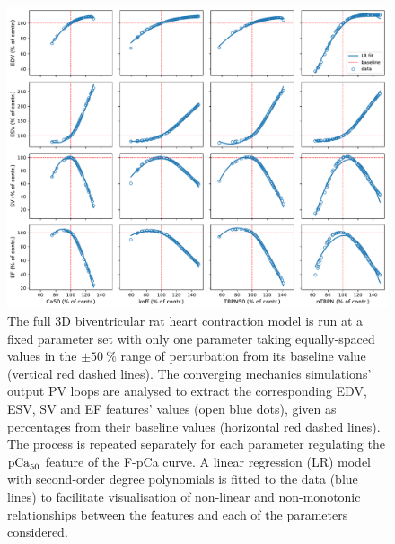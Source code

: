 \begin{figure}[h!]
    \myfloatalign
    \includegraphics[width=\textwidth]{figures/chapter08/Fig1.pdf}
    \caption{The full $3$D biventricular rat heart contraction model is run at a fixed parameter set with only one parameter taking equally-spaced values in the $\pm\SI{50}{\percent}$ range of perturbation from its baseline value (vertical red dashed lines). The converging mechanics simulations' output PV loops are analysed to extract the corresponding EDV, ESV, SV and EF features' values (open blue dots), given as percentages from their baseline values (horizontal red dashed lines). The process is repeated separately for each parameter regulating the $\textrm{pCa}_{50}$ feature of the F-pCa curve. A linear regression (LR) model with second-order degree polynomials is fitted to the data (blue lines) to facilitate visualisation of non-linear and non-monotonic relationships between the features and each of the parameters considered.}
    \label{fig:EFvsparamsnonmonotonic}
\end{figure}

